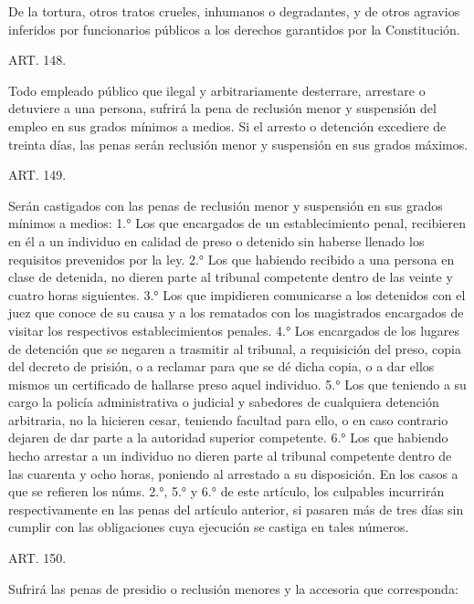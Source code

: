     De la tortura, otros tratos crueles, inhumanos o degradantes, y de otros agravios inferidos por funcionarios públicos a los derechos garantidos por la Constitución.








    ART. 148.

    Todo empleado público que ilegal y arbitrariamente desterrare, arrestare o detuviere a una persona, sufrirá la pena de reclusión menor y suspensión del empleo en sus grados mínimos a medios.
    Si el arresto o detención excediere de treinta días, las penas serán reclusión menor y suspensión en sus grados máximos.


    ART. 149.

    Serán castigados con las penas de reclusión menor y suspensión en sus grados mínimos a medios:
    1.° Los que encargados de un establecimiento penal, recibieren en él a un individuo en calidad de preso o detenido sin haberse llenado los requisitos prevenidos por la ley.
    2.° Los que habiendo recibido a una persona en clase de detenida, no dieren parte al tribunal competente dentro de las veinte y cuatro horas siguientes.
    3.° Los que impidieren comunicarse a los detenidos con el juez que conoce de su causa y a los rematados con los magistrados encargados de visitar los respectivos establecimientos penales.
    4.° Los encargados de los lugares de detención que se negaren a trasmitir al tribunal, a requisición del preso, copia del decreto de prisión, o a reclamar para que se dé dicha copia, o a dar ellos mismos un certificado de hallarse preso aquel individuo.
    5.° Los que teniendo a su cargo la policía administrativa o judicial y sabedores de cualquiera detención arbitraria, no la hicieren cesar, teniendo facultad para ello, o en caso contrario dejaren de dar parte a la autoridad superior competente.
    6.° Los que habiendo hecho arrestar a un individuo no dieren parte al tribunal competente dentro de las cuarenta y ocho horas, poniendo al arrestado a su disposición.
    En los casos a que se refieren los núms. 2.°, 5.° y 6.° de este artículo, los culpables incurrirán respectivamente en las penas del artículo anterior, si pasaren más de tres días sin cumplir con las obligaciones cuya ejecución se castiga en tales números.




    ART. 150.

    Sufrirá las penas de presidio o reclusión menores y la accesoria que corresponda:

